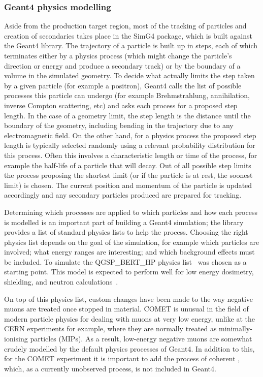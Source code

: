 \subsubsection{Geant4 physics modelling}
Aside from the production target region, most of the tracking of particles and creation of secondaries takes place in the SimG4 package, which is built against the Geant4 library.
The trajectory of a particle is built up in steps, each of which terminates either by a physics process (which might change the particle's direction or energy and produce a secondary track) or by the boundary of a volume in the simulated geometry.
To decide what actually limits the step taken by a given particle (for example a positron), Geant4 calls the list of possible processes this particle can undergo (for example Brehmstrahlung, annihilation, inverse Compton scattering, etc) and asks each process for a proposed step length. 
In the case of a geometry limit, the step length is the distance until the boundary of the geometry, including bending in the trajectory due to any electromagnetic field.
On the other hand, for a physics process the proposed step length is typically selected randomly using a relevant probability distribution for this process.
Often this involves a characteristic length or time of the process, for example the half-life of a particle that will decay.
Out of all possible step limits the process proposing the shortest limit (or if the particle is at rest, the soonest limit) is chosen.
The current position and momentum of the particle is updated accordingly and any secondary particles produced are prepared for tracking.

\FigSoftwarePhysicsSpectra
Determining which processes are applied to which particles and how each process is modelled is an important part of building a Geant4 simulation; the library provides a list of standard physics lists to help the process.
Choosing the right physics list depends on the goal of the simulation, for example which particles are involved; what energy ranges are interesting; and which background effects must be included.
To simulate \COMET the QGSP\_BERT\_HP physics list~\cite{Geant4:physicsLists} was chosen as a starting point.
This model is expected to perform well for low energy dosimetry, shielding, and neutron calculations~\cite{Geant4:PhysicsListsRecommends}.

On top of this physics list, custom changes have been made to the way negative muons are treated once stopped in material.
COMET is unusual in the field of modern particle physics for dealing with muons at very low energy, unlike at the \ac{CERN} experiments for example, where they are normally treated as minimally-ionising particles (MIPs).
As a result,  low-energy negative muons are somewhat crudely modelled by the default physics processes of Geant4.
In addition to this, for the COMET experiment it is important to add the process of coherent \mueconv, which, as a currently unobserved process, is not included in Geant4.

